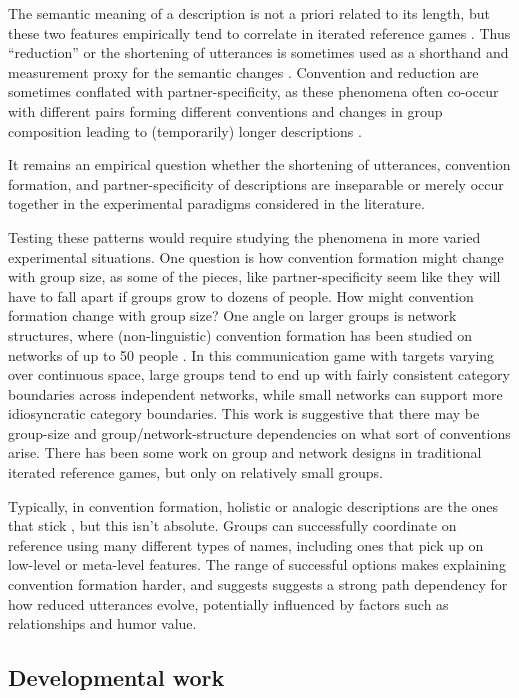 \documentclass[]{article}
\begin{document}
The semantic meaning of a description is not a priori related to its length, but these two features empirically tend to correlate in iterated reference games \citep{hawkins2020b}.  Thus ``reduction'' or the shortening of utterances is sometimes used as a shorthand and measurement proxy for the semantic changes \citep{clark1986, hawkins2021}. Convention and reduction are sometimes conflated with partner-specificity, as these phenomena often co-occur with different pairs forming different conventions and changes in group composition leading to (temporarily) longer descriptions \citet{clark1986, wilkes-gibbs1992}. 

It remains an empirical question whether the shortening of utterances, convention formation, and partner-specificity of descriptions are inseparable or merely occur together in the experimental paradigms considered in the literature. 

Testing these patterns would require studying the phenomena in more varied experimental situations. One question is how convention formation might change with group size, as some of the pieces, like partner-specificity seem like they will have to fall apart if groups grow to dozens of people.  How might convention formation change with group size? One angle on larger groups is network structures, where (non-linguistic) convention formation has been studied on networks of up to 50 people \citep{guilbeault2021}. In this communication game with targets varying over continuous space, large groups tend to end up with fairly consistent category boundaries across independent networks, while small networks can support more idiosyncratic category boundaries. This work is suggestive that there may be group-size and group/network-structure dependencies on what sort of conventions arise. There has been some work on group and network designs in traditional iterated reference games, but only on relatively small groups. 

Typically, in convention formation, holistic or analogic descriptions are the ones that stick \citep{clark1986}, but this isn't absolute. Groups can successfully coordinate on reference using many different types of names, including ones that pick up on low-level or meta-level features. The range of successful options makes explaining convention formation harder, and suggests  suggests a strong path dependency for how reduced utterances evolve, potentially influenced by factors such as relationships and humor value. 

\subsection{Developmental work}
\end{document}
